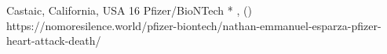           {Castaic, California, USA}
          {16}
          {Pfizer/BioNTech}
          {*}
          {
            ,
             ()
          }
          {https://nomoresilence.world/pfizer-biontech/nathan-emmanuel-esparza-pfizer-heart-attack-death/}
